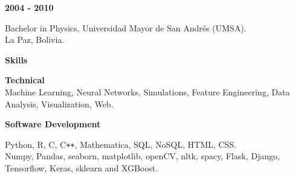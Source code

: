\documentclass[a4paper,12pt,final]{memoir}
\newcommand{\SmallSep}{\vspace{0.5em}}
\newcommand{\CVSection}[1]
	{\Large\textbf{#1}\par
	\SmallSep\normalsize\normalfont}
\newcommand{\CVItem}[1]
	{\textbf{\color{RoyalBlue} #1}}
\begin{document}
\CVItem{2004 - 2010}\\
\begin{small}
Bachelor in Physics, Universidad Mayor de San Andr\'{e}s (UMSA).\\
La Paz, Bolivia.
\end{small}

\SmallSep

\CVSection{Skills}


\CVItem{Technical}\\
{\small Machine Learning, Neural Networks, Simulations, Feature Engineering, Data Analysis, Visualization, Web.\\}
\vspace{-10pt}
\SmallSep

\CVItem{Software Development}\\
\begin{small}
Python, R, C, C\texttt{++}, Mathematica, SQL, NoSQL, HTML, CSS.\\
Numpy, Pandas, seaborn, matplotlib, openCV, nltk, spacy, Flask, Django, Tensorflow, Keras, sklearn and XGBoost.\\
\end{small}





\end{document}
